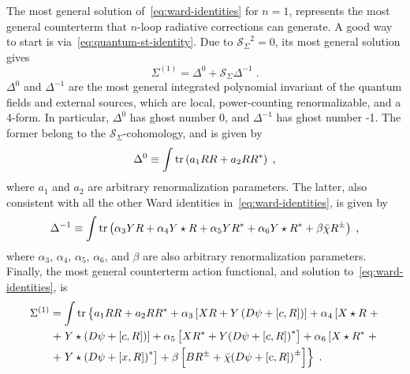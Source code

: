 \documentclass[../main.tex]{subfiles}
\begin{document}
The most general solution of~\eqref{eq:ward-identities} for $n=1$, represents the most general counterterm that $n$-loop radiative corrections can generate. A good way to start is via~\eqref{eq:quantum-st-identity}. Due to $ {\mathcal{S}_{\Sigma}}^{ 2 } = 0 $, its most general solution gives
\begin{equation}
  \label{eq:solution-to-quantum-st}
  \Sigma^{ (1) } = \Delta^0 + \mathcal{S}_{ \Sigma } \Delta^{ -1 }\;.
\end{equation}
$ \Delta^0 $ and $ \Delta^{ -1 } $ are the most general integrated polynomial invariant of the quantum fields and external sources, which are local, power-counting renormalizable, and a 4-form. In particular, $ \Delta^0 $ has ghost number 0, and $ \Delta^{ -1 } $ has ghost number -1. The former belong to the $ \mathcal{S}_{ \Sigma } $-cohomology, and is given by
\begin{equation}
  \label{eq:delta0}
  \Delta^0 \equiv \int \operatorname{tr} \left( a_1 RR + a_2 RR^* \right) \;,
\end{equation}
where $ a_1 $ and $ a_2 $ are arbitrary renormalization parameters. The latter, also consistent with all the other Ward identities in~\eqref{eq:ward-identities}, is given by
\begin{equation}
  \label{eq:delta-1}
  \Delta^{-1} \equiv \int \operatorname{tr} \left( \alpha_3 Y R + \alpha_4 Y \star R + \alpha_5 Y R^* + \alpha_6 Y \star R^* + \beta \bar{ \chi } R^{\pm} \right) \;,
\end{equation}
where $ \alpha_3 $, $ \alpha_4 $, $ \alpha_5 $, $ \alpha_6 $, and $ \beta $ are also arbitrary renormalization parameters. Finally, the most general counterterm action functional, and solution to~\eqref{eq:ward-identities}, is
\begin{align}
  \label{eq:ct-action}
  \Sigma^{ (1) } & = \int \tr \left\{ \vphantom{^{\pm}} a_1 R R + a_2 R R^* + \alpha_3 \left[ X R + Y \left( D \psi + \left[ c, R \right] \right) \right] + \alpha_4 \left[ X \star R \right. + \right. \nonumber                            \\
                 & \left. + \left. Y \star \left( D \psi + \left[ c, R \right] \right) \right] + \alpha_5 \left[ X R^* + Y {\left( D \psi + \left[ c, R \right] \right)}^* \right] + \alpha_6 \left[ X \star R^* \right. + \right. \nonumber \\
                 & \left. + \left. Y \star {\left( D \psi + \left[ x, R \right] \right)}^* \right] + \beta \left[ BR^{ \pm } + \bar{ \chi } {\left( D \psi + \left[ c, R \right] \right)}^{ \pm }  \right]\right\} \;.
\end{align}
\end{document}
